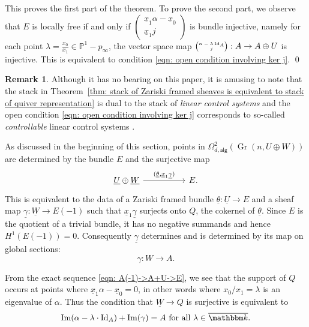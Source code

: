 \message{ !name(Bryan-Vakil.tex)}\documentclass{amsart}
\theoremstyle{definition}
\newtheorem{remark}[theorem]{Remark}
\newcommand{\kk} {{\mathbbm k}}
\newcommand{\PP}{\mathbb{P}}
\newcommand{\im}{\operatorname{Im}}
\newcommand{\UL}[1]{\underline{#1}}
\newcommand{\alg}{\mathsf{alg}}
\newcommand{\Gr}{\operatorname{Gr}}
\newcommand{\LoopTwo}{\Omega^{2}_{d,\alg}}
\newcommand{\Id}{\operatorname{Id}}
\begin{document}
This proves the first part of the theorem. To prove the second part,
we observe that  $E$ is locally free if and only if
$ \left(\begin{smallmatrix} \UL{x}_{1} \alpha -\UL{x}_{0}\\ 
\UL{x}_{1}j \end{smallmatrix} \right)$ is bundle injective, namely for
each point $\lambda =\frac{x_{0}}{x_{1}}\in \PP^{1}-p_{\infty}$,
the vector space map ${\tiny \begin{pmatrix} \alpha -\lambda \Id_{A}\\
j \end{pmatrix}} : A\to A\oplus U $ is injective. This is equivalent
to condition \eqref{eqn: open condition involving ker j}.
\qed 

\begin{remark}\label{rem: linear control systems}
Although it has no bearing on this paper, it is amusing to note that
the stack in Theorem~\ref{thm: stack of Zariski framed sheaves is
equivalent to stack of quiver representation} is dual to the stack of
\emph{linear control systems} and the open condition \eqref{eqn: open
condition involving ker j} corresponds to so-called
\emph{controllable} linear control systems
\cite{Geiss-intro-to-moduli-quivers}.
\end{remark}


As discussed in the beginning of this section, points in $\LoopTwo
(\Gr (n,U\oplus W))$ are determined by the bundle $E$ and the
surjective map
\[
\begin{tikzcd}[column sep={8em,between origins}]
\UL{U}\oplus \UL{W} \arrow{r}{(\UL{\theta },\UL{x}_{1}\UL{\gamma})} &E .
\end{tikzcd}
\]
This is equivalent to the data of a Zariski framed bundle
$\UL{\theta}:\UL{U}\to E$ and a sheaf map $\UL{\gamma}:\UL{W}\to
E(-1)$ such that $\UL{x}_{1}\UL{\gamma}$ surjects onto $Q$, the
cokernel of $\UL{\theta}$. Since $E$ is the quotient of a trivial
bundle, it has no negative summands and hence
$H^{1}(E(-1))=0$. Consequently $\UL{\gamma}$ determines and is
determined by its map on global sections:
\[
\gamma :W \to A.
\]

From the exact sequence \eqref{eqn: A(-1)->A+U->E}, we see that the
support of $Q$ occurs at points where $\UL{x}_{1}\alpha
-\UL{x}_{0}=0$, in other words where $x_{0}/x_{1}=\lambda $ is an
eigenvalue of $\alpha$. Thus the condition that $\UL{W}\to Q$ is
surjective is equivalent to
\begin{equation}\label{eqn: open condition with gamma}
\im (\alpha -\lambda \cdot \Id_{A})+ \im (\gamma )=A \text{ for
all }\lambda\in \overline{\kk}.
\end{equation}
\end{document}
